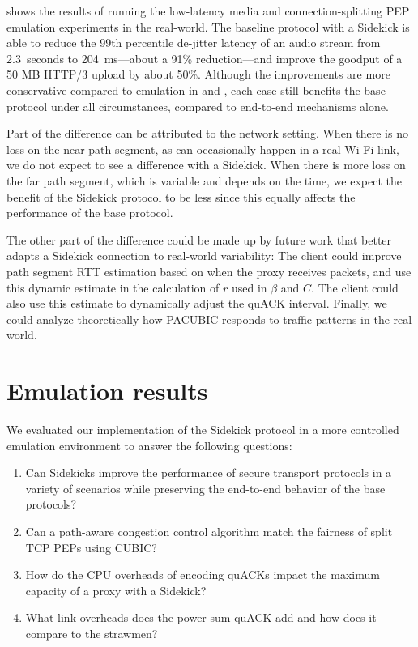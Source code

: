  shows the results of running the low-latency
media and connection-splitting PEP emulation experiments in the real-world.
The baseline protocol with a Sidekick is able to
reduce the 99th percentile de-jitter latency of an audio stream
from 2.3~seconds to 204~ms---about a 91\% reduction---and
improve the goodput of a 50 MB HTTP/3 upload by about 50\%.
Although the improvements are more conservative compared to emulation in
 and
, each case still benefits the
base protocol under all circumstances, compared to end-to-end mechanisms alone.

Part of the difference can be attributed to the network setting. When there is
no loss on the near path segment, as can occasionally happen in a real Wi-Fi
link, we do not expect to see a difference with a Sidekick. When there is more
loss on the far path segment, which is variable and depends on the time, we
expect the benefit of the Sidekick protocol to be less since this equally affects the
performance of the base protocol.

The other part of the difference could be made up by future work that better
adapts a Sidekick connection to real-world variability: The client could
improve path segment RTT estimation based on when the proxy receives packets,
and use this dynamic estimate in the calculation of $r$ used in $\beta$ and
$C$. The client could also use this estimate to dynamically adjust the quACK
interval. Finally, we could analyze theoretically how PACUBIC responds to
traffic patterns in the real world.

\section{Emulation results}
\label{sec:sidekick:emulation}



We evaluated our implementation of the Sidekick protocol in a more controlled
emulation environment to answer the following questions:
\begin{enumerate}[noitemsep,topsep=0pt]
	\item Can Sidekicks improve the performance of secure transport protocols
	in a variety of scenarios while preserving the end-to-end behavior of the
	base protocols?
	\item Can a path-aware congestion control algorithm match the fairness of
	split TCP PEPs using CUBIC?
	\item How do the CPU overheads of encoding quACKs impact the maximum
	capacity of a proxy with a Sidekick?
	\item What link overheads does the power sum quACK add and how does it
	compare to the strawmen?
\end{enumerate}

